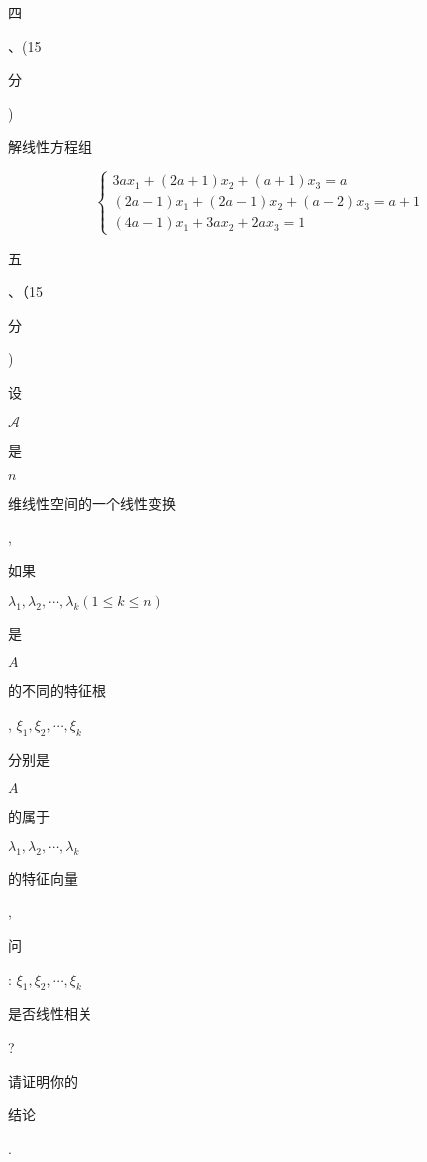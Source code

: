 \documentclass[10pt]{article}
\begin{document}
\begin{CJK}{UTF8}{mj}四\end{CJK}、(15 \begin{CJK}{UTF8}{mj}分\end{CJK}) \begin{CJK}{UTF8}{mj}解线性方程组\end{CJK}
$$
\left\{\begin{array}{l}
3 a x_{1}+(2 a+1) x_{2}+(a+1) x_{3}=a \\
(2 a-1) x_{1}+(2 a-1) x_{2}+(a-2) x_{3}=a+1 \\
(4 a-1) x_{1}+3 a x_{2}+2 a x_{3}=1
\end{array}\right.
$$
\begin{CJK}{UTF8}{mj}五\end{CJK}、（15 \begin{CJK}{UTF8}{mj}分\end{CJK}) \begin{CJK}{UTF8}{mj}设\end{CJK} $\mathscr{A}$ \begin{CJK}{UTF8}{mj}是\end{CJK} $n$ \begin{CJK}{UTF8}{mj}维线性空间的一个线性变换\end{CJK}, \begin{CJK}{UTF8}{mj}如果\end{CJK} $\lambda_{1}, \lambda_{2}, \cdots, \lambda_{k}(1 \leqslant k \leqslant n)$ \begin{CJK}{UTF8}{mj}是\end{CJK} $A$ \begin{CJK}{UTF8}{mj}的不同的特征根\end{CJK}, $\xi_{1}, \xi_{2}, \cdots, \xi_{k}$ \begin{CJK}{UTF8}{mj}分别是\end{CJK} $A$ \begin{CJK}{UTF8}{mj}的属于\end{CJK} $\lambda_{1}, \lambda_{2}, \cdots, \lambda_{k}$ \begin{CJK}{UTF8}{mj}的特征向量\end{CJK}, \begin{CJK}{UTF8}{mj}问\end{CJK}: $\xi_{1}, \xi_{2}, \cdots, \xi_{k}$ \begin{CJK}{UTF8}{mj}是否线性相关\end{CJK}? \begin{CJK}{UTF8}{mj}请证明你的\end{CJK} \begin{CJK}{UTF8}{mj}结论\end{CJK}.
\end{document}
